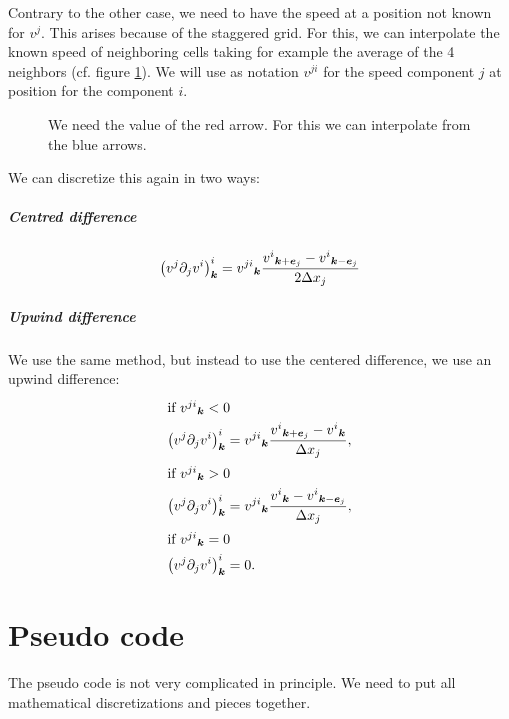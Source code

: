 \begin{remark}
  Contrary to the other case, we need to have the speed at a position not known for $v^{j}$. This arises because of the staggered grid.
  For this, we can interpolate the known speed of neighboring cells taking for example the average of the 4 neighbors (cf. figure \ref{fixed:staggered_convection_upwind}).
  We will use as notation $v^{ji}$ for the speed component $j$ at position for the component $i$.
  
  \begin{figure}
    \caption{We need the value of the red arrow. For this we can interpolate from  the blue arrows.}
    \label{fixed:staggered_convection_upwind}
    \end{figure}
\end{remark}
We can discretize this again in two ways:

\subparagraph{Centred difference}
\begin{equation}
\left(v^{j}\partial_{j}v^{i}\right)^{i}_{{\boldsymbol {k}}}={v^{ji}}_{{\boldsymbol {k}}}\frac{{v^{i}}_{{\boldsymbol {k}}+{\boldsymbol {e}}_j}-{v^{i}}_{{\boldsymbol {k}}-{\boldsymbol {e}}_j}}{2\Delta x_{j}}
\end{equation}

\subparagraph{Upwind difference}

We use the same method, but instead to use the centered difference, we use an upwind difference:
\begin{align}
\intertext{if ${v^{ji}}_{{\boldsymbol {k}}}<0$}
\left(v^{j}\partial_{j}v^{i}\right)^{i}_{{\boldsymbol {k}}}&={v^{ji}}_{{\boldsymbol {k}}}\frac{{v^{i}}_{{\boldsymbol {k}}+{\boldsymbol {e}}_j}-{v^{i}}_{{\boldsymbol {k}}}}{\Delta x_{j}},\\
\intertext{if ${v^{ji}}_{{\boldsymbol {k}}}>0$}
\left(v^{j}\partial_{j}v^{i}\right)^{i}_{{\boldsymbol {k}}}&={v^{ji}}_{{\boldsymbol {k}}}\frac{{v^{i}}_{{\boldsymbol {k}}}-{v^{i}}_{{\boldsymbol {k}}-{\boldsymbol {e}}_j}}{\Delta x_{j}},\\
\intertext{if ${v^{ji}}_{{\boldsymbol {k}}}=0$}
\left(v^{j}\partial_{j}v^{i}\right)^{i}_{{\boldsymbol {k}}}&=0.
\end{align}

\FloatBarrier
\section{Pseudo code}

The pseudo code is not very complicated in principle.
We need to put all mathematical discretizations and pieces together.

